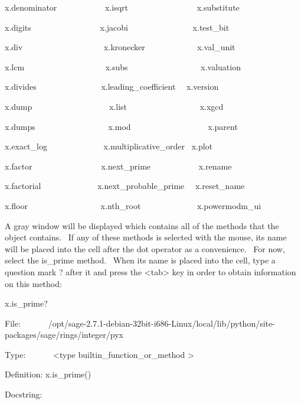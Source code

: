 \documentclass[12pt,twoside]{book}
\begin{document}
x.denominator \ \ \ \ \ \ \ \ \ \ \ x.isqrt
\ \ \ \ \ \ \ \ \ \ \ \ \ \ \ \ x.substitute

x.digits \ \ \ \ \ \ \ \ \ \ \ \ \ \ \ \ x.jacobi
\ \ \ \ \ \ \ \ \ \ \ \ \ \ \ x.test\_bit

x.div \ \ \ \ \ \ \ \ \ \ \ \ \ \ \ \ \ \ \ x.kronecker
\ \ \ \ \ \ \ \ \ \ \ \ x.val\_unit

x.lcm \ \ \ \ \ \ \ \ \ \ \ \ \ \ \ \ \ \ \ x.subs
\ \ \ \ \ \ \ \ \ \ \ \ \ \ \ \ \ x.valuation

x.divides \ \ \ \ \ \ \ \ \ \ \ \ \ \ \ x.leading\_coefficient
\ \ x.version

x.dump \ \ \ \ \ \ \ \ \ \ \ \ \ \ \ \ \ \ x.list
\ \ \ \ \ \ \ \ \ \ \ \ \ \ \ \ \ x.xgcd

x.dumps \ \ \ \ \ \ \ \ \ \ \ \ \ \ \ \ \ x.mod
\ \ \ \ \ \ \ \ \ \ \ \ \ \ \ \ \ \ x.parent

x.exact\_log \ \ \ \ \ \ \ \ \ \ \ \ \ x.multiplicative\_order \ x.plot

x.factor \ \ \ \ \ \ \ \ \ \ \ \ \ \ \ \ x.next\_prime
\ \ \ \ \ \ \ \ \ \ \ x.rename

x.factorial \ \ \ \ \ \ \ \ \ \ \ \ \ x.next\_probable\_prime
\ \ x.reset\_name

x.floor \ \ \ \ \ \ \ \ \ \ \ \ \ \ \ \ \ x.nth\_root
\ \ \ \ \ \ \ \ \ \ \ \ \ x.powermodm\_ui


\bigskip

A gray window will be displayed which contains all of the methods that
the object contains. \ If any of these methods is selected with the
mouse, its name will be placed into the cell after the dot operator as
a convenience. \ For now, select the is\_prime method. \ When its name
is placed into the cell, type a question mark
{\textquotesingle}?{\textquotesingle} after it and press the
{\textless}tab{\textgreater} key in order to obtain information on this
method:


\bigskip

x.is\_prime?

{\textbar}

File:
\ \ \ \ \ \ /opt/sage{}-2.7.1{}-debian{}-32bit{}-i686{}-Linux/local/lib/python/site{}-packages/sage/rings/integer/pyx

Type: \ \ \ \ \ \ {\textless}type
{\textquotesingle}builtin\_function\_or\_method
{\textquotesingle}{\textgreater}

Definition: x.is\_prime()


\bigskip

Docstring: 
\end{document}
